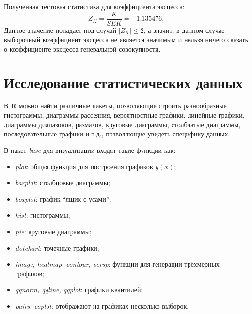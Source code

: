 Полученная тестовая статистика для коэффициента эксцесса:
\begin{equation*}
	Z_K = \frac{K}{SEK} = -1.135476.
\end{equation*}
Данное значение попадает под случай $\vert Z_K \vert \le 2$, а значит, в данном случае выборочный коэффициент эксцесса не является значимым и нельзя ничего сказать о коэффициенте эксцесса генеральной совокупности.

\section{Исследование статистических данных} %
\label{sec:analysis}

В \textbf{R} можно найти различные пакеты, позволяющие строить разнообразные гистограммы, диаграммы рассеяния, вероятностные графики, линейные графики, диаграммы диапазонов, размахов, круговые диаграммы, столбчатые диаграммы, последовательные графики и т.д., позволяющие увидеть специфику данных.

В пакет \textit{base} для визуализации входят такие функции как:
\begin{itemize}
\item \textit{plot}: общая функция для построения графиков $y(x)$;
\item \textit{barplot}: столбцовые диаграммы;
\item \textit{boxplot}: график ``ящик-с-усами'';
\item \textit{hist}: гистограммы;
\item \textit{pie}: круговые диаграммы;
\item \textit{dotchart}: точечные графики;
\item \textit{image, heatmap, contour, persp}: функции для генерации трёхмерных графиков;
\item \textit{qqnorm, qqline, qqplot}: графики квантилей;
\item \textit{pairs, coplot}: отображают на графиках несколько выборок.
\end{itemize}


